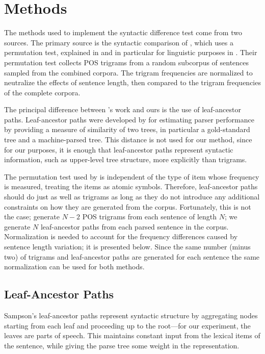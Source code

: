 \documentclass[11pt]{article}
\begin{document}
\section{Methods}

The methods used to implement the syntactic difference test come from two
sources. The primary source is the syntactic comparison of
\cite{nerbonne06}, which uses a permutation test, explained in
\cite{good95} and in particular for linguistic purposes in
\cite{kessler01}. Their permutation test
collects POS trigrams from a random subcorpus of sentences
sampled from the combined corpora. The trigram frequencies are
normalized to neutralize the
effects of sentence length, then compared to the
trigram frequencies of the complete corpora.

The principal difference between \cite{nerbonne06}'s work and ours is
the use of leaf-ancestor paths.
Leaf-ancestor paths were developed by \cite{sampson00} for
estimating parser performance by providing a measure of similarity of
two trees, in particular a gold-standard tree and a machine-parsed
tree. This distance is not used for our method, since for our purposes,
it is enough that leaf-ancestor paths represent syntactic information, such as
upper-level tree structure, more explicitly than trigrams.

The permutation test used by \cite{nerbonne06} is independent of the
type of item whose frequency is measured, treating the items as atomic
symbols. Therefore, leaf-ancestor paths should do just as well as
trigrams as long as they do not introduce any additional constraints
on how they are generated from the corpus. Fortunately, this is not
the case; \cite{nerbonne06} generate $N-2$ POS trigrams from each
sentence of length $N$; we generate $N$ leaf-ancestor paths from each
parsed sentence in the corpus. Normalization is needed to account for
the frequency differences caused by sentence length variation; it is
presented below. Since the same number (minus two) of trigrams and
leaf-ancestor paths are generated for each sentence the same
normalization can be used for both methods.

\subsection{Leaf-Ancestor Paths}

Sampson's leaf-ancestor paths represent syntactic structure
by aggregating nodes starting from each leaf and proceeding up to
the root---for our experiment, the leaves are parts of speech.
This maintains constant input from
the lexical items of the sentence, while giving the parse tree some
weight in the representation.
\end{document}
